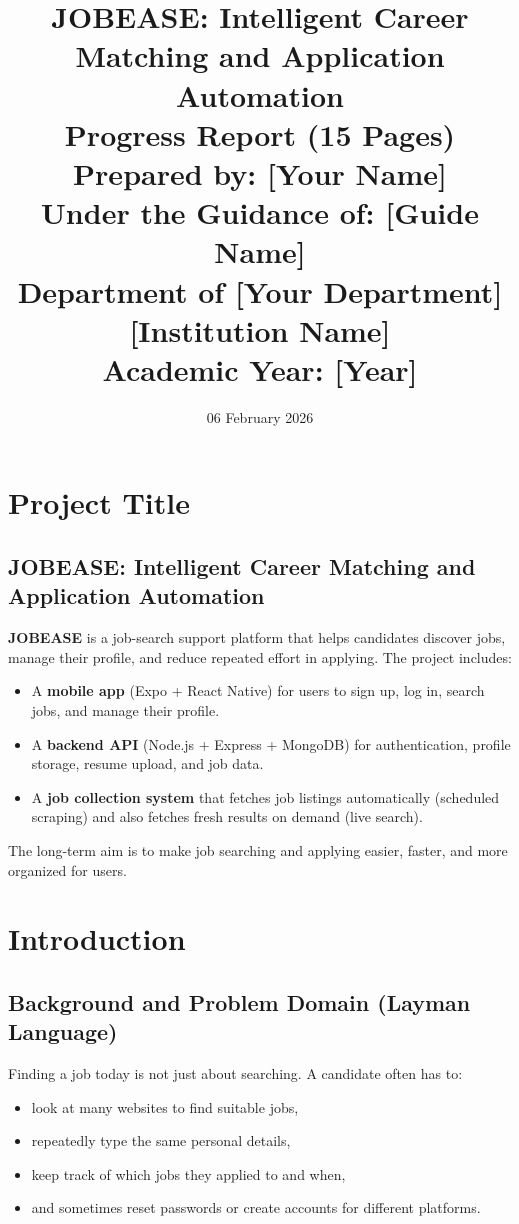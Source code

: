 \documentclass[12pt,a4paper]{report}
\title{
  \Huge{\textbf{JOBEASE: Intelligent Career Matching and Application Automation}}\\[6pt]
  \Large{Progress Report (15 Pages)}\\[18pt]
  \large{Prepared by: \textbf{[Your Name]}}\\[6pt]
  \large{Under the Guidance of: \textbf{[Guide Name]}}\\[18pt]
  \large{Department of \textbf{[Your Department]}}\\
  \large{\textbf{[Institution Name]}}\\[10pt]
  \large{Academic Year: \textbf{[Year]}}
}
\author{}
\date{06 February 2026}
\begin{document}
\maketitle
\thispagestyle{empty}
\newpage

\tableofcontents
\thispagestyle{empty}
\newpage
\setcounter{page}{1}

\chapter{Project Title}
\section*{JOBEASE: Intelligent Career Matching and Application Automation}

\noindent
\textbf{JOBEASE} is a job-search support platform that helps candidates discover jobs, manage their profile, and reduce repeated effort in applying. The project includes:
\begin{itemize}[leftmargin=*, itemsep=4pt]
  \item A \textbf{mobile app} (Expo + React Native) for users to sign up, log in, search jobs, and manage their profile.
  \item A \textbf{backend API} (Node.js + Express + MongoDB) for authentication, profile storage, resume upload, and job data.
  \item A \textbf{job collection system} that fetches job listings automatically (scheduled scraping) and also fetches fresh results on demand (live search).
\end{itemize}

\noindent
The long-term aim is to make job searching and applying easier, faster, and more organized for users.

\chapter{Introduction}
\section*{Background and Problem Domain (Layman Language)}

\noindent
Finding a job today is not just about searching. A candidate often has to:
\begin{itemize}[leftmargin=*, itemsep=4pt]
  \item look at many websites to find suitable jobs,
  \item repeatedly type the same personal details,
  \item keep track of which jobs they applied to and when,
  \item and sometimes reset passwords or create accounts for different platforms.
\end{itemize}
\end{document}
